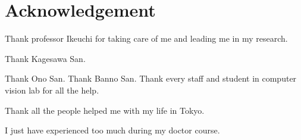 \chapter*{Acknowledgement}



Thank professor Ikeuchi for taking care of me and leading me in my research.

Thank Kagesawa San.

Thank Ono San. Thank Banno San. Thank every staff and student in computer vision lab for all the help.

Thank all the people helped me with my life in Tokyo.

I just have experienced too much during my doctor course.
